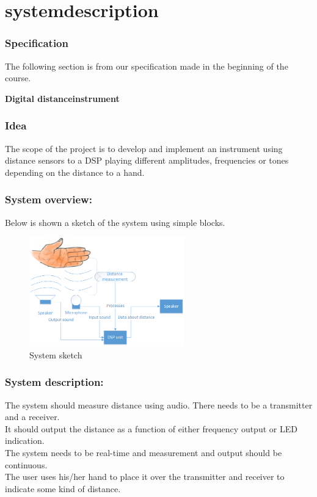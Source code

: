 \chapter{systemdescription}
\subsection{Specification}
The following section is from our specification made in the beginning of the course.\\
\begin{center}
\textbf{\HUGE Digital distanceinstrument}\\
\end{center}
\subsection{Idea}
The scope of the project is to develop and implement an instrument using distance sensors to a DSP playing different amplitudes, frequencies or tones depending on the distance to a hand.
\subsection{System overview:}
Below is shown a sketch of the system using simple blocks.
\begin{figure}[H]
\centering
\includegraphics[width=0.6\textwidth]{billeder/systemoverview}
\caption{System sketch}
\label{fig:systemoverview}
\end{figure}

\subsection{System description:}
The system should measure distance using audio. There needs to be a transmitter and a receiver.\\
It should output the distance as a function of either frequency output or LED indication.\\
The system needs to be real-time and measurement and output should be continuous.\\
The user uses his/her hand to place it over the transmitter and receiver to indicate some kind of distance.\\


